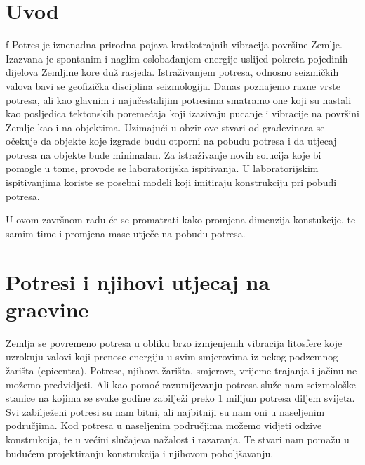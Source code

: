 \documentclass[12pt]{book}
\begin{document}


\pagestyle{empty}


\cleardoublepage
\begin{flushleft}
	
\end{flushleft}

\setcounter{page}{1}

\tableofcontents
\cleardoublepage

\listoffigures

\cleardoublepage
{}\listoftables


\clearpage

\pagestyle{plain}
\setcounter{page}{1}

\chapter{Uvod}f
Potres je iznenadna prirodna pojava kratkotrajnih vibracija površine Zemlje. Izazvana je spontanim i naglim oslobađanjem energije uslijed pokreta pojedinih dijelova Zemljine kore duž rasjeda. Istraživanjem potresa, odnosno seizmičkih valova bavi se geofizička disciplina seizmologija. Danas poznajemo razne vrste potresa, ali kao glavnim i najučestalijim potresima smatramo one koji su nastali kao posljedica tektonskih poremećaja koji izazivaju pucanje i vibracije na površini Zemlje kao i na objektima. Uzimajući u obzir ove stvari od građevinara se očekuje da objekte koje izgrade budu otporni na pobudu potresa i da utjecaj potresa na objekte bude minimalan. Za istraživanje novih solucija koje bi pomogle u tome, provode se laboratorijska ispitivanja. U laboratorijskim ispitivanjima koriste se posebni modeli koji imitiraju konstrukciju pri pobudi potresa. 

U ovom završnom radu će se promatrati kako promjena dimenzija konstukcije, te samim time i promjena mase utječe na pobudu potresa.

\chapter{Potresi i njihovi utjecaj na gra\DJ evine}
Zemlja se povremeno potresa u obliku brzo izmjenjenih vibracija litosfere koje uzrokuju valovi koji prenose energiju u svim smjerovima iz nekog podzemnog žarišta (epicentra). Potrese, njihova žarišta, smjerove, vrijeme trajanja i jačinu ne možemo predvidjeti. Ali kao pomoć razumijevanju potresa služe nam seizmološke stanice na kojima se svake godine zabilježi preko 1 milijun potresa diljem svijeta. Svi zabilježeni potresi su nam bitni, ali najbitniji su nam oni u naseljenim područjima. Kod potresa u naseljenim područjima možemo vidjeti odzive konstrukcija, te u većini slučajeva nažalost i razaranja. Te stvari nam pomažu u budućem projektiranju konstrukcija i njihovom poboljšavanju.
\end{document}
